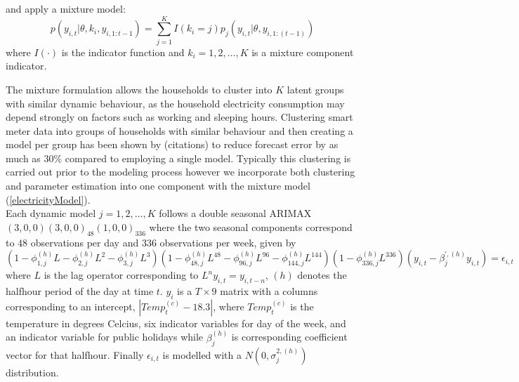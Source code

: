 \documentclass[12pt,a4paper]{article}\usepackage[]{graphicx}\usepackage[]{color}
\begin{document}
\iffalse
and apply a mixture of Markov switching models:
\begin{equation}
\label{electricityModelSwitch}
p(y_{i, t} | \theta, k_i, s_{i, t}, y_{i, 1:t-1}) = \sum_{j=1}^K I(k_{i} = j) \left(s_{i, t} p_{d, j}(y_{i, t} | \theta, y_{i, 1:(t-1)}) + (1 - s_{i, t}) p_{c, j} (y_{i, t} | \theta) \right)
\end{equation}
where $I(\cdot)$ is the indicator function, $s_{i, t} = 0, 1,$ is a Markov switching indicator and $k_i = 1, 2, \dots, K$ is a mixture component indicator. This model allows each household to switch between a time dynamic model with likelihood $p_{d, j} (y_{i, t} | \theta, y_{i, 1:(t-1)})$ and a low level constant mean model with likelihood $p_{c, j}(y_{i, j} | \theta)$ for periods where the household occupants are away for long periods.
\\

\fi

and apply a mixture model:
\begin{equation}
\label{electricityModel}
p(y_{i, t} | \theta, k_i, y_{i, 1:t-1}) = \sum_{j=1}^K I(k_{i} = j) p_{j}(y_{i, t} | \theta, y_{i, 1:(t-1)})
\end{equation}
where $I(\cdot)$ is the indicator function and $k_i = 1, 2, \dots, K$ is a mixture component indicator.

The mixture formulation allows the households to cluster into $K$ latent groups with similar dynamic behaviour, as the household electricity consumption may depend strongly on factors such as working and sleeping hours. Clustering smart meter data into groups of households with similar behaviour and then creating a model per group has been shown by (citations) to reduce forecast error by as much as 30\% compared to employing a single model. Typically this clustering is carried out prior to the modeling process however we incorporate both clustering and parameter estimation into one component with the mixture model (\ref{electricityModel}).
\\

Each dynamic model $j = 1, 2, \dots, K$ follows a double seasonal ARIMAX $(3, 0, 0)(3, 0, 0)_{48}(1, 0, 0)_{336}$ where the two seasonal components correspond to $48$ observations per day and $336$ observations per week, given by
\begin{equation}
\label{dynamic}
(1 - \phi_{1, j}^{(h)}L - \phi_{2, j}^{(h)}L^2 - \phi_{3, j}^{(h)} L^3)(1 - \phi_{48, j}^{(h)}L^{48} - \phi_{96, j}^{(h)}L^{96} - \phi_{144, j}^{(h)}L^{144})(1 - \phi_{336, j}^{(h)}L^{336}) (y_{i, t} -  \beta^{\prime, {(h)}}_{j} y_{i, t}) = \epsilon_{i, t}
\end{equation}
where $L$ is the lag operator corresponding to $L^n y_{i, t} = y_{i, t- n}$, $(h)$ denotes the halfhour period of the day at time $t$. $y_{i}$ is a $T \times 9$ matrix with a columns corresponding to an intercept, $|Temp^{(c)}_{t} - 18.3|$, where $Temp^{(c)}_{t}$ is the temperature in degrees Celcius, six indicator variables for day of the week, and an indicator variable for public holidays while $\beta_{j}^{(h)}$ is corresponding coefficient vector for that halfhour. Finally $\epsilon_{i, t}$ is modelled with a $N(0, \sigma^{2, (h)}_{j})$ distribution.
\\
\end{document}
